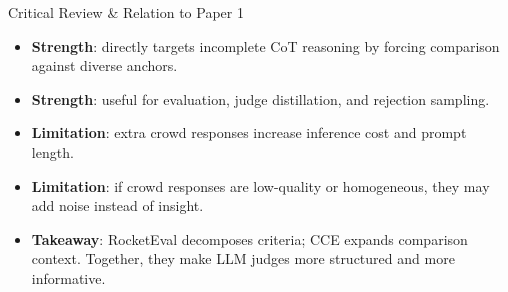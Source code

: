 \documentclass[10pt]{beamer}
\begin{document}
\begin{frame}{Critical Review \& Relation to Paper 1}
  \begin{itemize}
    \item \textbf{Strength}: directly targets incomplete CoT reasoning by forcing comparison against diverse anchors.
    \item \textbf{Strength}: useful for evaluation, judge distillation, and rejection sampling.
    \item \textbf{Limitation}: extra crowd responses increase inference cost and prompt length.
    \item \textbf{Limitation}: if crowd responses are low-quality or homogeneous, they may add noise instead of insight.
    \item \textbf{Takeaway}: RocketEval decomposes criteria; CCE expands comparison context. Together, they make LLM judges more structured and more informative.
  \end{itemize}
\end{frame}
\end{document}
